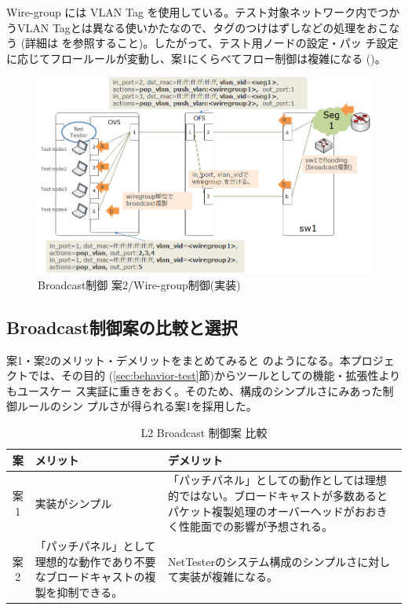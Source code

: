 Wire-group には VLAN Tag を使用している。テスト対象ネットワーク内でつか
うVLAN Tagとは異なる使いかたなので、タグのつけはずしなどの処理をおこなう
(詳細は \lopjtech を参照すること)。したがって、テスト用ノードの設定・パッ
チ設定に応じてフロールールが変動し、案1にくらべてフロー制御は複雑になる
()。

\begin{figure}[h]
 \centering
 \includegraphics[scale=0.6]{img/l2bcctrl_plan2_implement.png}
 \caption{Broadcast制御 案2/Wire-group制御(実装)}
 \label{fig:l2bcctrl_plan2_implement}
\end{figure}

  \subsection{Broadcast制御案の比較と選択}
  \label{sec:l2bcctrl-compare}

案1・案2のメリット・デメリットをまとめてみると
のようになる。本プロジェクトでは、その目的
(\ref{sec:behavior-test}節)からツールとしての機能・拡張性よりもユースケー
ス実証に重きをおく。そのため、構成のシンプルさにみあった制御ルールのシン
プルさが得られる案1を採用した。

\begin{table}[h]
 \caption{L2 Broadcast 制御案 比較}
 \label{tab:l2bcctrl_compare}
 \centering
 \begin{tabularx}{\linewidth}{c|X|X}
  \hline
  案 & メリット & デメリット \\ \hline
  \hline
  案1 & 実装がシンプル
      & 「パッチパネル」としての動作としては理想的ではない。ブロードキャストが多数あるとパケット複製処理のオーバーヘッドがおおきく性能面での影響が予想される。 \\ \hline
  案2 & 「パッチパネル」として理想的な動作であり不要なブロードキャストの複製を抑制できる。
      & NetTesterのシステム構成のシンプルさに対して実装が複雑になる。 \\ \hline
 \end{tabularx}
 \end{table}

